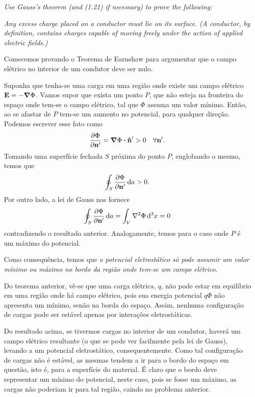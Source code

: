 



 \textit{Use Gauss's theorem (and (1.21) if necessary) to prove the following:}

 \textit{Any excess charge placed on a conductor must lie on its surface. (A conductor, by definition, contains charges capable of moving freely under the action of applied electric fields.)}

Comecemos provando o Teorema de Earnshaw para argumentar que o campo elétrico no interior de um condutor deve ser nulo.

Suponha que tenha-se uma carga em uma região onde existe um campo elétrico $\vb{E} = -\grad{\Phi}$. Vamos supor que exista um ponto $P$, que não esteja na fronteira do espaço onde tem-se o campo elétrico, tal que $\Phi$ assuma um valor mínimo. Então, ao se afastar de $P$ tem-se um aumento no potencial, para qualquer direção. Podemos escrever esse fato como
\begin{equation*}
  \pdv{\Phi}{\vb{n}^\prime} = \grad{\Phi} \vdot \vu{n}^\prime > 0
  \quad \forall \vb{n}^\prime .
\end{equation*}
Tomando uma superfície fechada $S$ próxima do ponto $P$, englobando o mesmo, temos que
\begin{equation*}
  \oint_S \pdv{\Phi}{\vb{n}^\prime} \dd{a} > 0.
\end{equation*}
Por outro lado, a lei de Gauss nos fornece
\begin{equation*}
  \oint_S \pdv{\Phi}{\vb{n}^\prime} \dd{a} = \int_V \laplacian{\Phi} \dd[3]{x} = 0
\end{equation*}
contradizendo o resultado anterior. Analogamente, temos para o caso onde $P$ é um máximo do potencial.

Como consequência, temos que \textit{o potencial eletrostático só pode assumir um valor mínimo ou máximo no bordo da região onde tem-se um campo elétrico}.

Do teorema anterior, vê-se que uma carga elétrica, $q$, não pode estar em equilíbrio em uma região onde há campo elétrico, pois sua energia potencial $q\Phi$ não apresenta um mínimo, senão na borda do espaço. Assim, nenhuma configuração de cargas pode ser estável apenas por interações eletrostáticas.

Do resultado acima, se tivermos cargas no interior de um condutor, haverá um campo elétrico resultante (o que se pode ver facilmente pela lei de Gauss), levando a um potencial eletrostático, consequentemente. Como tal configuração de cargas não é estável, as mesmas tendem a ir para o bordo do espaço em questão, isto é, para a superfície do material. É claro que o bordo deve representar um mínimo do potencial, neste caso, pois se fosse um máximo, as cargas não poderiam ir para tal região, caindo no problema anterior.


